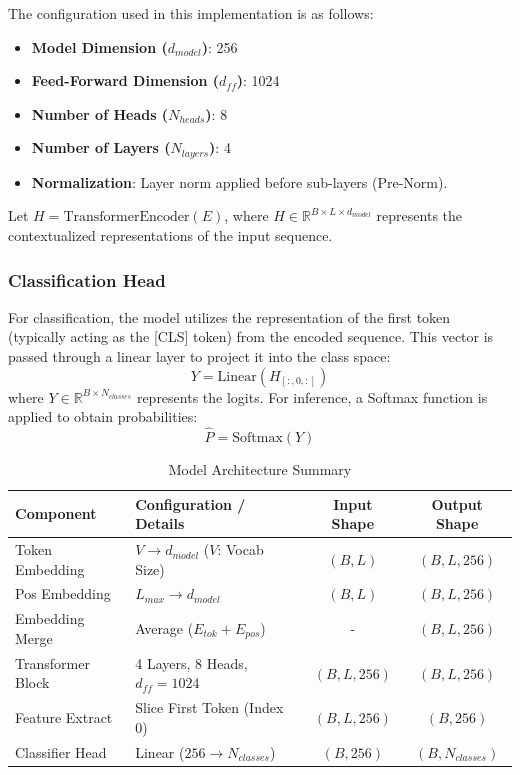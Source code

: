 \documentclass[11pt,a4paper]{article}
\begin{document}
The configuration used in this implementation is as follows:
\begin{itemize}
    \item \textbf{Model Dimension ($d_{model}$)}: 256
    \item \textbf{Feed-Forward Dimension ($d_{ff}$)}: 1024
    \item \textbf{Number of Heads ($N_{heads}$)}: 8
    \item \textbf{Number of Layers ($N_{layers}$)}: 4
    \item \textbf{Normalization}: Layer norm applied before sub-layers (Pre-Norm).
\end{itemize}

Let $H = \text{TransformerEncoder}(E)$, where $H \in \mathbb{R}^{B \times L \times d_{model}}$ represents the contextualized representations of the input sequence.

\subsubsection{Classification Head}
For classification, the model utilizes the representation of the first token (typically acting as the [CLS] token) from the encoded sequence. This vector is passed through a linear layer to project it into the class space:
\begin{equation}
    Y = \text{Linear}(H_{[:, 0, :]})
\end{equation}
where $Y \in \mathbb{R}^{B \times N_{classes}}$ represents the logits. For inference, a Softmax function is applied to obtain probabilities:
\begin{equation}
    \hat{P} = \text{Softmax}(Y)
\end{equation}

\begin{table}[h]
\centering
\caption{Model Architecture Summary}
\label{tab:model_arch}
\begin{tabular}{|l|l|c|c|}
\hline
\textbf{Component} & \textbf{Configuration / Details} & \textbf{Input Shape} & \textbf{Output Shape} \\ \hline
Token Embedding & $V \to d_{model}$ ($V$: Vocab Size) & $(B, L)$ & $(B, L, 256)$ \\ \hline
Pos Embedding & $L_{max} \to d_{model}$ & $(B, L)$ & $(B, L, 256)$ \\ \hline
Embedding Merge & Average ($E_{tok} + E_{pos}$) & - & $(B, L, 256)$ \\ \hline
Transformer Block & 4 Layers, 8 Heads, $d_{ff}=1024$ & $(B, L, 256)$ & $(B, L, 256)$ \\ \hline
Feature Extract & Slice First Token (Index 0) & $(B, L, 256)$ & $(B, 256)$ \\ \hline
Classifier Head & Linear ($256 \to N_{classes}$) & $(B, 256)$ & $(B, N_{classes})$ \\ \hline
\end{tabular}
\end{table}
\end{document}
